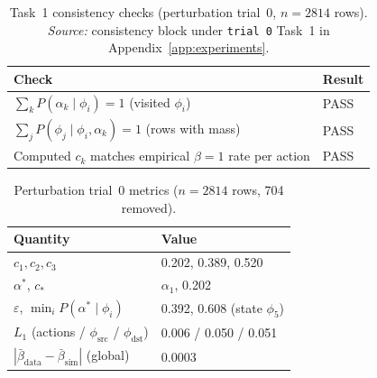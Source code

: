 \documentclass[11pt,a4paper]{article}
\begin{document}
\begin{table}[htbp]
  \centering
  \caption{Task~1 consistency checks (perturbation trial~0, $n=2814$ rows).%
    \newline\emph{Source:} consistency block under \texttt{trial~0} Task~1 in
    Appendix~\ref{app:experiments}.}
  \label{tab:perturbation-trial0-consistency}
  \begin{tabular}{@{}ll@{}}
    \toprule
    \textbf{Check} & \textbf{Result} \\
    \midrule
    $\sum_k P(\alpha_k \mid \phi_i) = 1$ (visited $\phi_i$) & PASS \\
    $\sum_j P(\phi_j \mid \phi_i, \alpha_k) = 1$ (rows with mass) & PASS \\
    Computed $c_k$ matches empirical $\beta{=}1$ rate per action & PASS \\
    \bottomrule
  \end{tabular}
\end{table}

\begin{table}[htbp]
  \centering
  \caption{Perturbation trial~0 metrics ($n=2814$ rows, 704 removed).}
  \label{tab:perturbation-trial0-metrics}
  \begin{tabular}{@{}ll@{}}
    \toprule
    \textbf{Quantity} & \textbf{Value} \\
    \midrule
    $c_1,c_2,c_3$ & 0.202, 0.389, 0.520 \\
    $\alpha^\ast$, $c_\ast$ & $\alpha_1$, 0.202 \\
    $\varepsilon$, $\min_i P(\alpha^\ast\mid\phi_i)$ & 0.392, 0.608 (state $\phi_5$) \\
    $L_1$ (actions / $\phi_{\mathrm{src}}$ / $\phi_{\mathrm{dst}}$) & 0.006 / 0.050 / 0.051 \\
    $|\bar\beta_{\mathrm{data}}-\bar\beta_{\mathrm{sim}}|$ (global) & 0.0003 \\
    \bottomrule
  \end{tabular}
\end{table}
\end{document}
